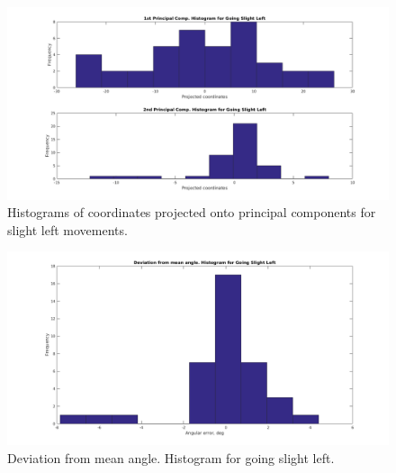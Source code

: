 \documentclass[paper=a4, fontsize=11pt]{scrartcl} %
\begin{document}
    \begin{figure}[h!]
        \begin{center}
            \setlength{\fboxsep}{0.5pt} %
            \setlength{\fboxrule}{0.5pt}
            \includegraphics[width=\linewidth,fbox]{images/pca_histogram_slightLeft.png}
            \caption{Histograms of coordinates projected onto principal components for slight left movements.}
        \end{center}
	\end{figure}
	\begin{figure}[h!]
		\begin{center}
			\setlength{\fboxsep}{0.5pt} %
			\setlength{\fboxrule}{0.5pt}
			\includegraphics[width=\linewidth,fbox]{images/histogram_2_phi_slightLeft.png}
			\caption{Deviation from mean angle. Histogram for going slight left.}
		\end{center}
	\end{figure}

    \newpage
\end{document}
